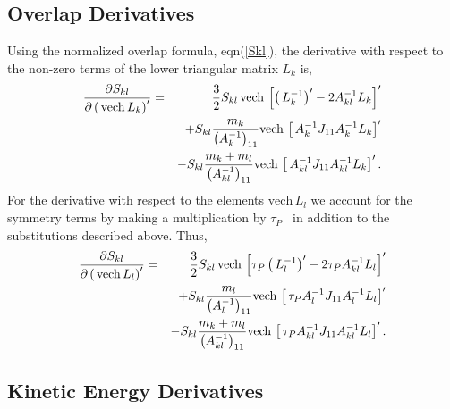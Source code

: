 \documentclass[12pt,doublespace]{article}
\begin{document}
\subsection{Overlap Derivatives}

Using the normalized overlap formula, eqn(\ref{Skl}), the derivative with
respect to the non-zero terms of the lower triangular matrix $L_{k}$ is, 
\begin{eqnarray}
\frac{\partial S_{kl}}{\partial \left( \,\mathrm{vech}\,L_{k}\right)
^{\prime }} &=&\frac{3}{2}S_{kl}\,\mathrm{vech}\,\left[ \left(
\,L_{k}^{-1}\right) ^{\prime }-2A_{kl}^{-1}L_{k}\right] ^{\prime }  \notag \\
&&+S_{kl}\frac{m_{k}}{\left( A_{k}^{-1}\right) _{11}}\mathrm{vech}\,\left[
\,A_{k}^{-1}J_{11}A_{k}^{-1}L_{k}\right] ^{\prime }  \notag \\
&&-S_{kl}\frac{m_{k}+m_{l}}{\left( A_{kl}^{-1}\right) _{11}}\mathrm{vech}\,%
\left[ \,A_{kl}^{-1}J_{11}A_{kl}^{-1}L_{k}\right] ^{\prime }.
\end{eqnarray}
For the derivative with respect to the elements $\mathrm{vech}\,L_{l}$ we
account for the symmetry terms by making a multiplication by $\tau _{P}$ \
in addition to the substitutions described above. Thus, 
\begin{eqnarray}
\frac{\partial S_{kl}}{\partial \left( \,\mathrm{vech}\,L_{l}\right)
^{\prime }} &=&\frac{3}{2}S_{kl}\,\mathrm{vech}\,\left[ \tau _{P}\left(
\,L_{l}^{-1}\right) ^{\prime }-2\tau _{P}A_{kl}^{-1}L_{l}\right] ^{\prime } 
\notag \\
&&+S_{kl}\frac{m_{l}}{\left( A_{l}^{-1}\right) _{11}}\mathrm{vech}\,\left[
\,\tau _{P}A_{l}^{-1}J_{11}A_{l}^{-1}L_{l}\right] ^{\prime }  \notag \\
&&-S_{kl}\frac{m_{k}+m_{l}}{\left( A_{kl}^{-1}\right) _{11}}\mathrm{vech}\,%
\left[ \,\tau _{P}A_{kl}^{-1}J_{11}A_{kl}^{-1}L_{l}\right] ^{\prime }.
\end{eqnarray}

\subsection{Kinetic Energy Derivatives}
\end{document}

